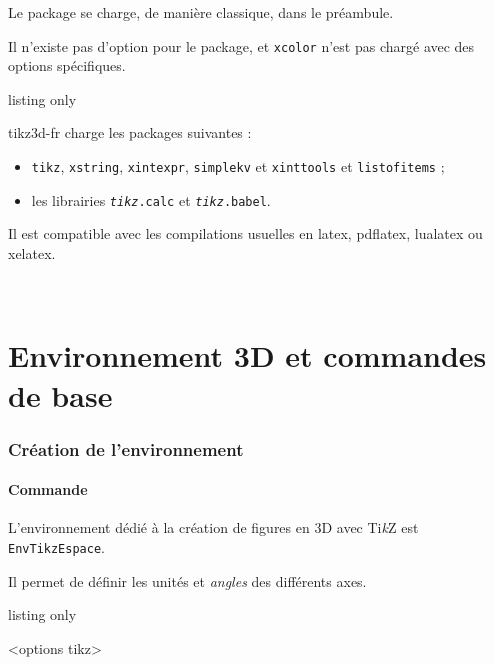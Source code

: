 \documentclass[french,a4paper,11pt]{article}
\providecommand\tikzlogo{Ti\textit{k}Z}
\let\TikZ\tikzlogo
\begin{document}
\begin{importantblock}
Le package se charge, de manière classique, dans le préambule.

Il n'existe pas d'option pour le package, et \texttt{xcolor} n'est pas chargé avec des options spécifiques.
\end{importantblock}

\begin{PresCodeTex}{listing only}
\usepackage{tikz3d-fr}
\end{PresCodeTex}

\begin{noteblock}
\textsf{tikz3d-fr} charge les packages suivantes :

\begin{itemize}
	\item \texttt{tikz}, \texttt{xstring}, \texttt{xintexpr}, \texttt{simplekv} et \texttt{xinttools} et \texttt{listofitems} ;
	\item les librairies \texttt{\textit{tikz}.calc} et \texttt{\textit{tikz}.babel}.
\end{itemize}

Il est compatible avec les compilations usuelles en \textsf{latex}, \textsf{pdflatex}, \textsf{lualatex} ou \textsf{xelatex}.
\end{noteblock}

\vfill~

\pagebreak

\part{Environnement 3D et commandes de base}

\section{Création de l'environnement}

\subsection{Commande}

\begin{cautionblock}
L'environnement dédié à la création de figures en 3D avec \TikZ{} est \texttt{EnvTikzEspace}.

Il permet de définir les unités et \textit{angles} des différents axes.
\end{cautionblock}

\begin{PresCodeTex}{listing only}
\begin{EnvTikzEspace}[Clés]<options tikz>
\end{EnvTikzEspace}
\end{PresCodeTex}
\end{document}
